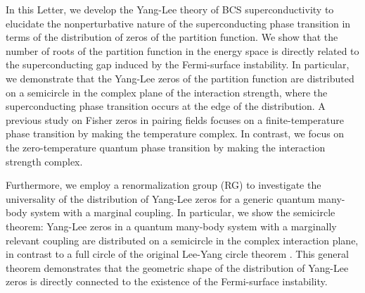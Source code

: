 \documentclass[aps,prl,twocolumn,superscriptaddress]{revtex4-1}
\begin{document}
In this Letter, we develop the Yang-Lee theory of BCS superconductivity to elucidate the nonperturbative nature of the superconducting phase transition in terms of the distribution of zeros of the partition function. We show that the number of roots of the partition function in the energy space is directly related to the superconducting gap induced by the Fermi-surface instability. In particular, we demonstrate that the Yang-Lee zeros of the partition function are distributed on a semicircle in the complex plane of the interaction strength, where the superconducting phase transition occurs at the edge of the distribution.
A previous study \cite{Sumaryada:2007uu} on Fisher zeros in pairing fields focuses on a finite-temperature phase transition by making the temperature complex. In contrast, we focus on the zero-temperature quantum phase transition by making the interaction strength complex.  %
\begin{comment}
In this Letter, we develop a theory of Yang-Lee zeros in BCS superconductivity and show that Yang-Lee zeros are distributed on a semicircle on the complex plane of interaction strength due to the Fermi-surface pairing instability.
We demonstrate that the superconducting phase transition occurs at
the edge of the distribution of Yang-Lee zeros and the nonperturbative
behavior of the phase transition is encoded in the number of roots of the partition function in the energy space. In contrast to a previous study \cite{Sumaryada:2007uu} on Fisher zeros in pairing fields at complex temperature in a finite-temperature phase transition, we extend the interaction strength to a complex regime at absolute zero with a focus on the quantum phase transition.
\end{comment}


Furthermore, we employ a renormalization group (RG) to investigate the 
universality of the distribution of Yang-Lee zeros
for a generic quantum many-body system with a marginal coupling. In particular, we show the semicircle theorem: Yang-Lee zeros in a quantum many-body system with a marginally relevant coupling are distributed on a semicircle
in the complex interaction plane, in contrast to a full circle of the original Lee-Yang circle
theorem \cite{PhysRev.87.404,PhysRev.87.410}. This general theorem demonstrates that the geometric shape of the distribution of Yang-Lee zeros is directly connected to the existence of the Fermi-surface instability.%
\end{document}
